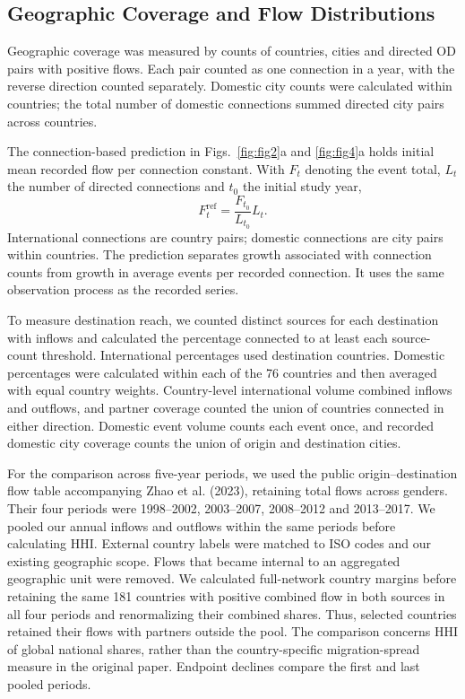 \subsection{Geographic Coverage and Flow Distributions}

Geographic coverage was measured by counts of countries, cities and directed OD pairs with positive flows. Each pair counted as one connection in a year, with the reverse direction counted separately. Domestic city counts were calculated within countries; the total number of domestic connections summed directed city pairs across countries.

The connection-based prediction in Figs.~\ref{fig:fig2}a and \ref{fig:fig4}a holds initial mean recorded flow per connection constant. With $F_t$ denoting the event total, $L_t$ the number of directed connections and $t_0$ the initial study year,
\begin{equation*}
F_t^{\mathrm{ref}}=\frac{F_{t_0}}{L_{t_0}}L_t.
\end{equation*}
International connections are country pairs; domestic connections are city pairs within countries. The prediction separates growth associated with connection counts from growth in average events per recorded connection. It uses the same observation process as the recorded series.

To measure destination reach, we counted distinct sources for each destination with inflows and calculated the percentage connected to at least each source-count threshold. International percentages used destination countries. Domestic percentages were calculated within each of the 76 countries and then averaged with equal country weights. Country-level international volume combined inflows and outflows, and partner coverage counted the union of countries connected in either direction. Domestic event volume counts each event once, and recorded domestic city coverage counts the union of origin and destination cities.

For the comparison across five-year periods, we used the public origin--destination flow table accompanying Zhao et al. (2023)\cite{ref039}, retaining total flows across genders. Their four periods were 1998--2002, 2003--2007, 2008--2012 and 2013--2017. We pooled our annual inflows and outflows within the same periods before calculating HHI. External country labels were matched to ISO codes and our existing geographic scope. Flows that became internal to an aggregated geographic unit were removed. We calculated full-network country margins before retaining the same 181 countries with positive combined flow in both sources in all four periods and renormalizing their combined shares. Thus, selected countries retained their flows with partners outside the pool. The comparison concerns HHI of global national shares, rather than the country-specific migration-spread measure in the original paper. Endpoint declines compare the first and last pooled periods.


